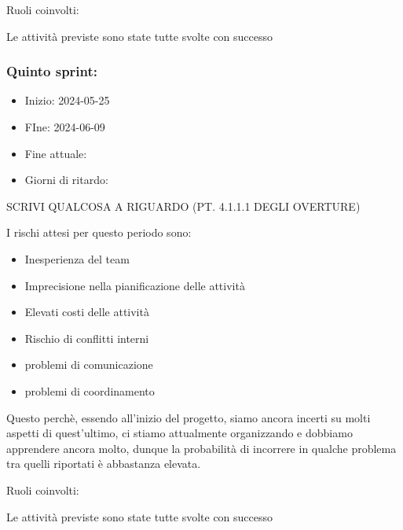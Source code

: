 Ruoli coinvolti:

Le attività previste sono state tutte svolte con successo





\subsubsection{Quinto sprint:}
\begin{itemize}
    \item Inizio: 2024-05-25
    \item FIne: 2024-06-09
    \item Fine attuale:
    \item Giorni di ritardo:
\end{itemize}

SCRIVI QUALCOSA A RIGUARDO (PT. 4.1.1.1 DEGLI OVERTURE)

I rischi attesi per questo periodo sono:
\begin{itemize}
    \item Inesperienza del team
    \item Imprecisione nella pianificazione delle attività
    \item Elevati costi delle attività
    \item Rischio di conflitti interni 
    \item problemi di comunicazione
    \item problemi di coordinamento
\end{itemize}
Questo perchè, essendo all’inizio del progetto, siamo ancora incerti su molti aspetti di quest’ultimo, ci stiamo attualmente organizzando e dobbiamo apprendere ancora molto, dunque la probabilità di incorrere in qualche problema tra quelli riportati è abbastanza elevata.

Ruoli coinvolti:

Le attività previste sono state tutte svolte con successo




